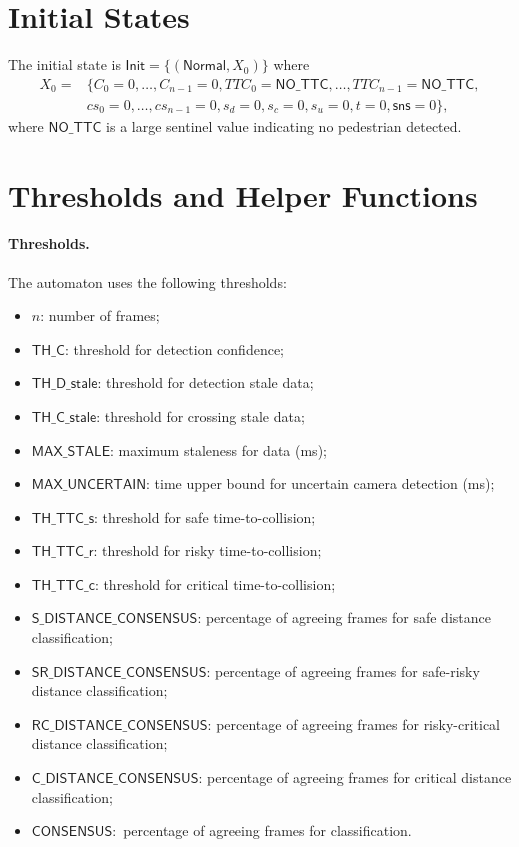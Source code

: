 \documentclass[12pt]{article}
\theoremstyle{definition}
\begin{document}
\section{Initial States}
The initial state is 
\(\mathsf{Init} = \{(\mathsf{Normal}, X_0)\}\)
where 
\[
\begin{aligned}
    X_0 = &\{C_0 = 0, \ldots, C_{n-1} = 0, TTC_0 = \mathsf{NO\_TTC}, \ldots, TTC_{n-1} = \mathsf{NO\_TTC}, \\
            &cs_0 = 0, \ldots, cs_{n-1} = 0, s_d = 0, s_c = 0, s_u = 0, t = 0, \mathsf{sns} = 0\},
\end{aligned}
\]
where $\mathsf{NO\_TTC}$ is a large sentinel value indicating no pedestrian detected.


\section{Thresholds and Helper Functions}

\paragraph{Thresholds.} The automaton uses the following thresholds:
\begin{itemize}
    \item $n$: number of frames;
    \item $\mathsf{TH\_C}$: threshold for detection confidence;
    \item $\mathsf{TH\_D\_stale}$: threshold for detection stale data;
    \item $\mathsf{TH\_C\_stale}$: threshold for crossing stale data;
    \item $\mathsf{MAX\_STALE}$: maximum staleness for data (ms);
    \item $\mathsf{MAX\_UNCERTAIN}$: time upper bound for uncertain camera detection (ms);
    \item $\mathsf{TH\_TTC\_s}$: threshold for safe time-to-collision;
    \item $\mathsf{TH\_TTC\_r}$: threshold for risky time-to-collision;
    \item $\mathsf{TH\_TTC\_c}$: threshold for critical time-to-collision;
    \item $\mathsf{S\_DISTANCE\_CONSENSUS}$: percentage of agreeing frames for safe distance classification; 
    \item $\mathsf{SR\_DISTANCE\_CONSENSUS}$: percentage of agreeing frames for safe-risky distance classification;
    \item $\mathsf{RC\_DISTANCE\_CONSENSUS}$: percentage of agreeing frames for risky-critical distance classification;
    \item $\mathsf{C\_DISTANCE\_CONSENSUS}$: percentage of agreeing frames for critical distance classification;
    \item $\mathsf{CONSENSUS}: $ percentage of agreeing frames for classification.
\end{itemize}
\end{document}
